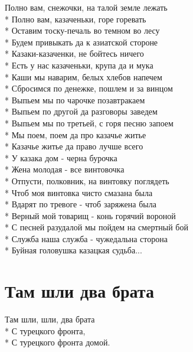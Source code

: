 \begin{minipage}{\linewidth}
Полно вам, снежочки, на талой земле лежать\\*
Полно вам, казаченьки, горе горевать\\*
Оставим тоску-печаль во темном во лесу\\*
Будем привыкать да к азиатской стороне\\*
Казаки-казаченки, не бойтесь ничего\\*
Есть у нас казаченьки, крупа да и мука\\*
Каши мы наварим, белых хлебов напечем\\*
Сбросимся по денежке, пошлем и за винцом\\*
Выпьем мы по чарочке позавтракаем\\*
Выпьем по другой да разговоры заведем\\*
Выпьем мы по третьей, с горя песню запоем\\*
Мы поем, поем  да про казачье житье\\*
Казачье житье да право лучше всего\\*
У казака дом - черна бурочка\\*
Жена молодая - все винтовочка\\*
Отпусти, полковник, на винтовку поглядеть\\*
Чтоб моя винтовка чисто смазана была\\*
Вдарят по тревоге - чтоб заряжена была\\*
Верный мой товарищ - конь горячий вороной\\*
С песней разудалой мы пойдем на смертный бой\\*
Служба наша служба - чужедальна сторона\\*
Буйная головушка казацкая судьба...\\
\end{minipage}

\vspace{\fill}\newpage

\section{Там шли два брата}
\label{song:Там_шли_два_брата}

\medskip

\begin{minipage}{\linewidth}
Там шли, шли, два брата\\*
С турецкого фронта,\\*
С турецкого фронта домой.\\
\end{minipage}\par\medskip\nobreak

